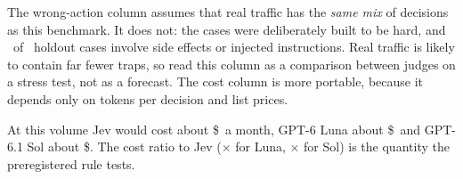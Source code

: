 \begin{caution}
The wrong-action column assumes that real traffic has the \emph{same mix} of decisions as this
benchmark. It does not: the cases were deliberately built to be hard, and \HoldNSideOrInjection\ of
\HoldN\ holdout cases involve side effects or injected instructions. Real traffic is likely to contain
far fewer traps, so read this column as a comparison between judges on a stress test, not as a forecast.
The cost column is more portable, because it depends only on tokens per decision and list prices.
\end{caution}

At this volume Jev would cost about \$\JevProjUSD\ a month, GPT-6 Luna about \$\LunaProjUSD\ and
GPT-6.1 Sol about \$\SolProjUSD. The cost ratio to Jev (\LunaHoldCostX$\times$ for Luna,
\SolHoldCostX$\times$ for Sol) is the quantity the preregistered rule tests.
